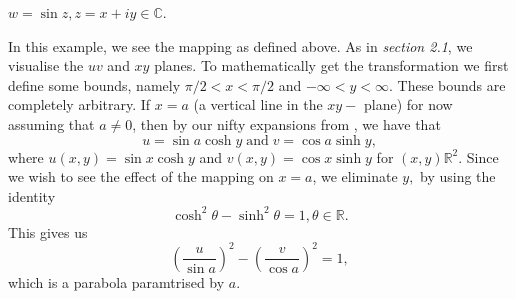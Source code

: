 \documentclass[12pt]{book}
\begin{document}
\begin{exmp}
    $w = \sin z, z = x + iy \in \mathbb{C}.$
\end{exmp}
In this example, we see the mapping as defined above. As in \textit{section 2.1}, we visualise the $uv$ and $xy$ planes. To mathematically get the transformation we first define some bounds, namely $\pi / 2 < x < \pi / 2$ and $-\infty < y < \infty.$ These bounds are completely arbitrary. If $x = a$ (a vertical line in the $xy-$ plane) for now assuming that $a \neq 0$, then by our nifty expansions from , we have that 
\[
    u = \sin a \cosh y \;\text{and}\; v = \cos a \sinh y, 
\]
where $u(x, y) = \sin x \cosh y$ and $v(x, y) = \cos x \sinh y$ for $(x, y) \mathbb{R}^{2}$. Since we wish to see the effect of the mapping on $x = a$, we eliminate $y,$ by using the identity
\[
    \cosh^{2} \theta - \sinh^{2} \theta = 1, \theta \in \mathbb{R}.
\]
This gives us 
\[
    \left(\frac{u}{\sin a}\right)^{2} - \left(\frac{v}{\cos a}\right)^{2} = 1,
\]
which is a parabola paramtrised by $a.$
\end{document}
